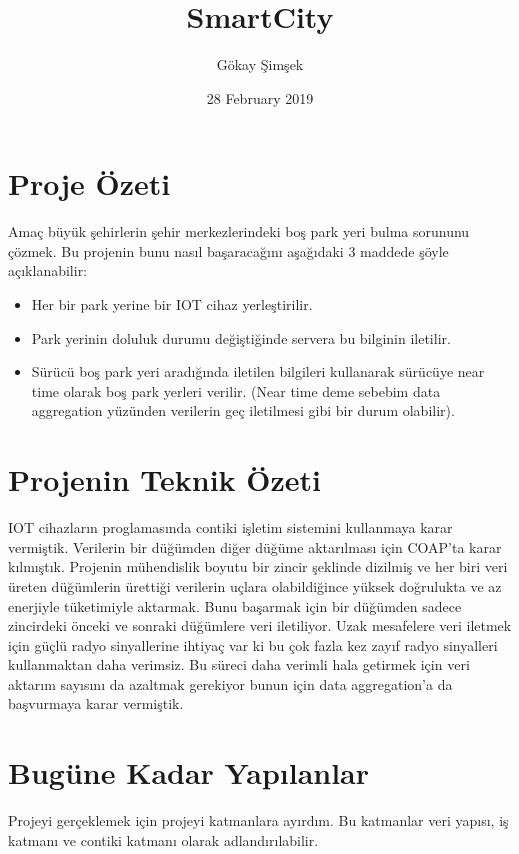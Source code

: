 \documentclass{article}
\title{SmartCity}
\author{Gökay Şimşek }
\date{28 February 2019}
\begin{document}
\maketitle

\tableofcontents
\newpage
\section{Proje Özeti}
Amaç büyük şehirlerin şehir merkezlerindeki boş park yeri bulma sorununu çözmek. Bu projenin bunu nasıl başaracağını aşağıdaki 3 maddede şöyle açıklanabilir:

\begin{itemize}
\item Her bir park yerine bir IOT cihaz yerleştirilir.
\item Park yerinin doluluk durumu değiştiğinde servera bu bilginin iletilir.
\item Sürücü boş park yeri aradığında iletilen bilgileri kullanarak sürücüye near time olarak boş park yerleri verilir. (Near time deme sebebim data aggregation yüzünden verilerin geç iletilmesi gibi bir durum olabilir).
\end{itemize}

\section{Projenin Teknik Özeti}
IOT cihazların proglamasında contiki işletim sistemini kullanmaya karar vermiştik. Verilerin bir düğümden diğer düğüme aktarılması için COAP'ta karar kılmıştık. Projenin mühendislik boyutu bir zincir şeklinde dizilmiş ve her biri veri üreten düğümlerin ürettiği verilerin uçlara olabildiğince yüksek doğrulukta ve az enerjiyle tüketimiyle aktarmak. Bunu başarmak için bir düğümden sadece zincirdeki önceki ve sonraki düğümlere veri iletiliyor. Uzak mesafelere veri iletmek için güçlü radyo sinyallerine ihtiyaç var ki bu çok fazla kez zayıf radyo sinyalleri kullanmaktan daha verimsiz. Bu süreci daha verimli hala getirmek için veri aktarım sayısını da azaltmak gerekiyor bunun için data aggregation'a da başvurmaya karar vermiştik.


\section{Bugüne Kadar Yapılanlar}
Projeyi gerçeklemek için projeyi katmanlara ayırdım. Bu katmanlar veri yapısı, iş katmanı ve contiki katmanı olarak adlandırılabilir. 
\end{document}
